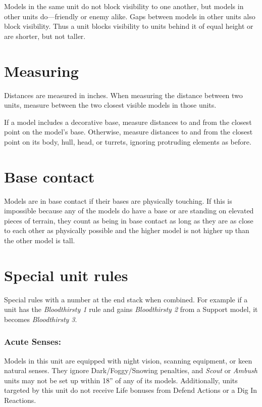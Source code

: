 \begin{multicols}{2}
Models in the same unit do not block visibility to one another, but models in other units do—friendly or enemy alike. Gaps between models in other units also block visibility. Thus a unit blocks visibility to units behind it of equal height or are shorter, but not taller.




\section*{Measuring}

Distances are measured in inches. When measuring the distance between two units, measure between the two closest visible models in those units.

If a model includes a decorative base, measure distances to and from the closest point on the model's base. Otherwise, measure distances to and from the closest point on its body, hull, head, or turrets, ignoring protruding elements as before.






\section*{Base contact}

Models are in base contact if their bases are physically touching. If this is impossible because any of the models do have a base or are standing on elevated pieces of terrain, they count as being in base contact as long as they are as close to each other as physically possible and the higher model is not higher up than the other model is tall.




\section*{Special unit rules}

Special rules with a number at the end stack when combined. For example if a unit has the \textit{Bloodthirsty 1} rule and gains \textit{Bloodthirsty 2} from a Support model, it becomes \textit{Bloodthirsty 3}.

\subsubsection*{Acute Senses:} Models in this unit are equipped with night vision, scanning equipment, or keen natural senses. They ignore Dark/Foggy/Snowing penalties, and \textit{Scout} or \textit{Ambush} units may not be set up within 18'' of any of its models. Additionally, units targeted by this unit do not receive Life bonuses from Defend Actions or a Dig In Reactions.


\end{multicols}

